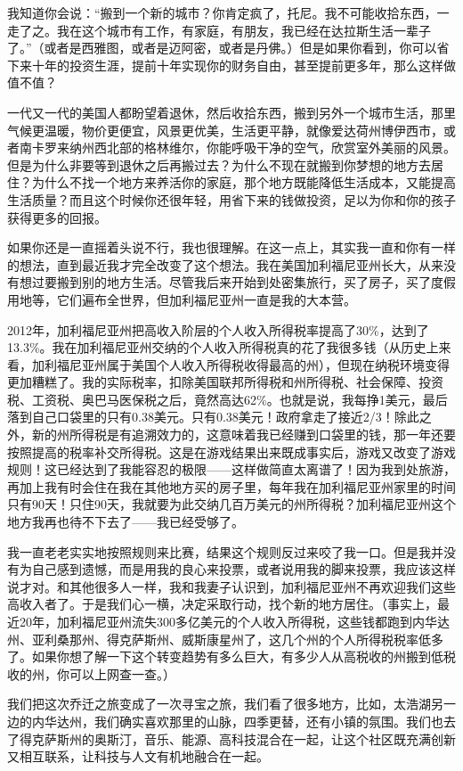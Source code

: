 我知道你会说：“搬到一个新的城市？你肯定疯了，托尼。我不可能收拾东西，一走了之。我在这个城市有工作，有家庭，有朋友，我已经在达拉斯生活一辈子了。”（或者是西雅图，或者是迈阿密，或者是丹佛。）但是如果你看到，你可以省下来十年的投资生涯，提前十年实现你的财务自由，甚至提前更多年，那么这样做值不值？

一代又一代的美国人都盼望着退休，然后收拾东西，搬到另外一个城市生活，那里气候更温暖，物价更便宜，风景更优美，生活更平静，就像爱达荷州博伊西市，或者南卡罗来纳州西北部的格林维尔，你能呼吸干净的空气，欣赏室外美丽的风景。但是为什么非要等到退休之后再搬过去？为什么不现在就搬到你梦想的地方去居住？为什么不找一个地方来养活你的家庭，那个地方既能降低生活成本，又能提高生活质量？而且这个时候你还很年轻，用省下来的钱做投资，足以为你和你的孩子获得更多的回报。

如果你还是一直摇着头说不行，我也很理解。在这一点上，其实我一直和你有一样的想法，直到最近我才完全改变了这个想法。我在美国加利福尼亚州长大，从来没有想过要搬到别的地方生活。尽管我后来开始到处密集旅行，买了房子，买了度假用地等，它们遍布全世界，但加利福尼亚州一直是我的大本营。

2012年，加利福尼亚州把高收入阶层的个人收入所得税率提高了30\%，达到了13.3\%。我在加利福尼亚州交纳的个人收入所得税真的花了我很多钱（从历史上来看，加利福尼亚州属于美国个人收入所得税收得最高的州），但现在纳税环境变得更加糟糕了。我的实际税率，扣除美国联邦所得税和州所得税、社会保障、投资税、工资税、奥巴马医保税之后，竟然高达62\%。也就是说，我每挣1美元，最后落到自己口袋里的只有0.38美元。只有0.38美元！政府拿走了接近2/3！除此之外，新的州所得税是有追溯效力的，这意味着我已经赚到口袋里的钱，那一年还要按照提高的税率补交所得税。这是在游戏结果出来既成事实后，游戏又改变了游戏规则！这已经达到了我能容忍的极限——这样做简直太离谱了！因为我到处旅游，再加上我有时会住在我在其他地方买的房子里，每年我在加利福尼亚州家里的时间只有90天！只住90天，我就要为此交纳几百万美元的州所得税？加利福尼亚州这个地方我再也待不下去了——我已经受够了。

我一直老老实实地按照规则来比赛，结果这个规则反过来咬了我一口。但是我并没有为自己感到遗憾，而是用我的良心来投票，或者说用我的脚来投票，我应该这样说才对。和其他很多人一样，我和我妻子认识到，加利福尼亚州不再欢迎我们这些高收入者了。于是我们心一横，决定采取行动，找个新的地方居住。（事实上，最近20年，加利福尼亚州流失300多亿美元的个人收入所得税，这些钱都跑到内华达州、亚利桑那州、得克萨斯州、威斯康星州了，这几个州的个人所得税税率低多了。如果你想了解一下这个转变趋势有多么巨大，有多少人从高税收的州搬到低税收的州，你可以上网查一查。）

我们把这次乔迁之旅变成了一次寻宝之旅，我们看了很多地方，比如，太浩湖另一边的内华达州，我们确实喜欢那里的山脉，四季更替，还有小镇的氛围。我们也去了得克萨斯州的奥斯汀，音乐、能源、高科技混合在一起，让这个社区既充满创新又相互联系，让科技与人文有机地融合在一起。

